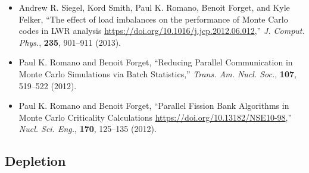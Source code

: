 \begin{itemize}
\item Andrew R. Siegel, Kord Smith, Paul K. Romano, Benoit Forget, and Kyle Felker,
``The effect of load imbalances on the performance of Monte Carlo codes in LWR
analysis \url{https://doi.org/10.1016/j.jcp.2012.06.012},'' \textit{J. Comput. Phys.},
\textbf{235}, 901--911 (2013).

\item Paul K. Romano and Benoit Forget, ``Reducing Parallel Communication in Monte
Carlo Simulations via Batch Statistics,'' \textit{Trans. Am. Nucl. Soc.}, \textbf{107},
519--522 (2012).

\item Paul K. Romano and Benoit Forget, ``Parallel Fission Bank Algorithms in Monte
Carlo Criticality Calculations \url{https://doi.org/10.13182/NSE10-98},''
\textit{Nucl. Sci. Eng.}, \textbf{170}, 125--135 (2012).

\end{itemize}

\subsection{Depletion}

